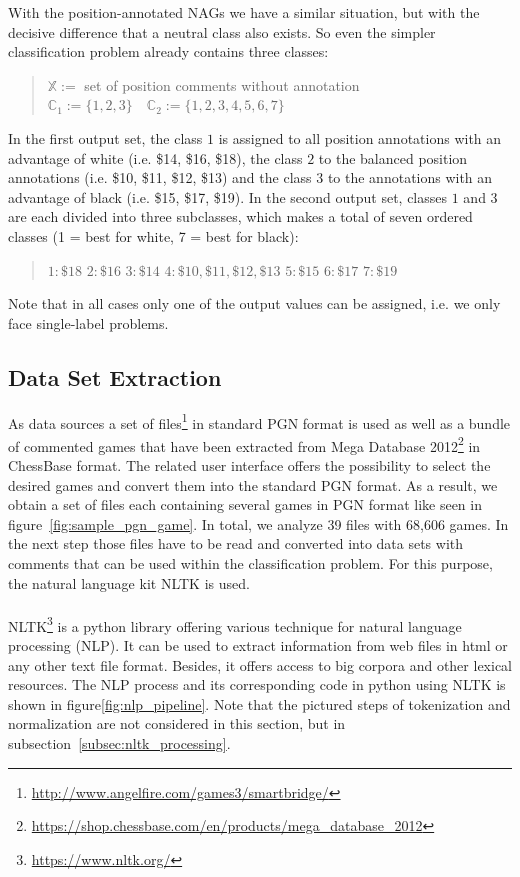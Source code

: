 \documentclass[article,type=msc,colorback,accentcolor=tud7b]{tudthesis}
\begin{document}
\begin{itemize}
      With the position-annotated NAGs we have a similar situation, but with the decisive difference that a neutral class also exists. So even the simpler classification problem already contains three classes:
      \begin{quotation}
        $\mathbb{X}:=$ set of position comments without annotation \quad $\mathbb{C}_{1}:=\{1,2,3\} \quad \mathbb{C}_{2}:=\{1,2,3,4,5,6,7\}$
      \end{quotation}
      In the first output set, the class $1$ is assigned to all position annotations with an advantage of white (i.e. \$14, \$16, \$18), the class $2$ to the balanced position annotations (i.e. \$10, \$11, \$12, \$13) and the class $3$ to the annotations with an advantage of black (i.e. \$15, \$17, \$19). In the second output set, classes $1$ and $3$ are each divided into three subclasses, which makes a total of seven ordered classes (1 = best for white, 7 = best for black):
      \begin{quotation}
        $1: \$18$ \quad $2: \$16$ \quad $3: \$14$ \quad $4: \$10,\$11,\$12,\$13$ \quad $5: \$15$ \quad $6: \$17$ \quad $7: \$19$
      \end{quotation}
    \end{itemize}
    Note that in all cases only one of the output values can be assigned, i.e. we only face single-label problems.
  
  \subsection{Data Set Extraction}
  \label{subsec:data_set_extraction}  
    As data sources a set of files\footnote{\url{http://www.angelfire.com/games3/smartbridge/}} in standard PGN format is used as well as a bundle of commented games that have been extracted from Mega Database 2012\footnote{\url{https://shop.chessbase.com/en/products/mega_database_2012}} in ChessBase format. The related user interface offers the possibility to select the desired games and convert them into the standard PGN format. As a result, we obtain a set of files each containing several games in PGN format like seen in figure~\ref{fig:sample_pgn_game}. In total, we analyze 39 files with 68,606 games. In the next step those files have to be read and converted into data sets with comments that can be used within the classification problem. For this purpose, the natural language kit NLTK is used. \\\\
    NLTK\footnote{\url{https://www.nltk.org/}} is a python library offering various technique for natural language processing (NLP). It can be used to extract information from web files in html or any other text file format. Besides, it offers access to big corpora and other lexical resources. The NLP process and its corresponding code in python using NLTK is shown in figure\ref{fig:nlp_pipeline}. Note that the pictured steps of tokenization and normalization are not considered in this section, but in subsection~\ref{subsec:nltk_processing}.
\end{document}
